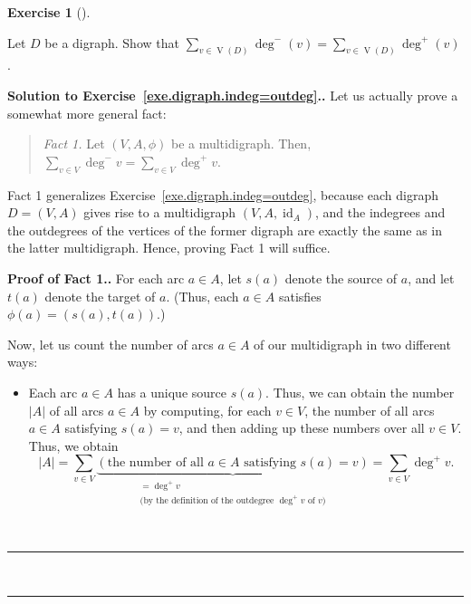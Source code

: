 \documentclass[numbers=enddot,12pt,final,onecolumn,notitlepage]{scrartcl}%
\newcounter{exer}
\theoremstyle{definition}
\newtheorem{exmp}[exer]{Exercise}
\newenvironment{exercise}[1][]
{\begin{exmp}[#1]\begin{leftbar}}
{\end{leftbar}\end{exmp}}
\newenvironment{statement}{\begin{quote}}{\end{quote}}
\newenvironment{proof}[1][Proof]{\noindent\textbf{#1.} }{\ \rule{0.5em}{0.5em}}
\let\sumnonlimits\sum
\renewcommand{\sum}{\sumnonlimits\limits}
\newcommand{\id}{\operatorname{id}}
\newcommand{\abs}[1]{\left| #1 \right|}
\newcommand{\tup}[1]{\left( #1 \right)}
\newcommand{\verts}[1]{\operatorname{V}\left( #1 \right)}
\begin{document}
\begin{exercise} \label{exe.digraph.indeg=outdeg}
Let $D$ be a digraph. Show that
$\sum_{v \in \verts{D}} \deg^-\tup{v}
= \sum_{v \in \verts{D}} \deg^+\tup{v}$.
\end{exercise}

\begin{proof}[Solution to Exercise~\ref{exe.digraph.indeg=outdeg}.]
Let us actually prove a somewhat more general fact:
\begin{statement}
\textit{Fact 1.} Let $\tup{V, A, \phi}$ be a
multidigraph.
Then,
$\sum_{v \in V} \deg^- v = \sum_{v \in V} \deg^+ v$.
\end{statement}

Fact 1 generalizes Exercise~\ref{exe.digraph.indeg=outdeg},
because each digraph $D = \tup{V, A}$ gives rise to a
multidigraph $\tup{V, A, \id_A}$, and the indegrees and
the outdegrees of the vertices of the former digraph are
exactly the same as in the latter multidigraph. Hence,
proving Fact 1 will suffice.

\begin{proof}[Proof of Fact 1.] For each arc $a \in A$, let
$s \tup{a}$ denote the source of $a$, and let $t \tup{a}$ denote the
target of $a$. (Thus, each $a \in A$ satisfies
$\phi \tup{a} = \tup{ s \tup{a}, t \tup{a} }$.)

Now, let us count the number of arcs $a \in A$ of our multidigraph in
two different ways:

\begin{itemize}
\item Each arc $a \in A$ has a unique source $s \tup{a}$. Thus, we can
obtain the number $\abs{A}$ of all arcs $a \in A$ by computing,
for each $v \in V$, the number of all arcs $a \in A$ satisfying
$s \tup{a} = v$, and then adding up these
numbers over all $v \in V$. Thus, we obtain
\begin{equation}
\abs{A}
= \sum_{v \in V}
  \underbrace{\left(\text{the number of all } a \in A
                \text{ satisfying } s \tup{a} = v \right)}_{
              \substack{= \deg^+ v \\
                \text{(by the definition of the outdegree } \deg^+ v
                \text{ of } v \text{})}}
= \sum_{v \in V} \deg^+ v .
\label{sol.digraph.indeg=outdeg.2}
\end{equation}


\end{itemize}
\end{proof}
\end{proof}
\end{document}
